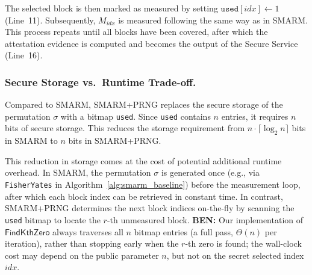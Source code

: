 \documentclass{ieeeaccess}
\DeclareRobustCommand{\ben}[1]{{\color{BENcolor}\textbf{BEN:} #1}}
\newcommand{\rtsmarmone}{SMARM+PRNG\xspace}
\begin{document}
The selected block is then marked as measured by setting $\texttt{used}[idx] \leftarrow 1$ (Line~11).
Subsequently, $M_{idx}$ is measured following the same way as in SMARM.
This process repeats until all blocks have been covered, after which the attestation evidence is computed and becomes the output of the Secure Service (Line~16).

\subsubsection{Secure Storage vs.\ Runtime Trade-off.}
Compared to SMARM, \rtsmarmone replaces the secure storage of the permutation $\sigma$ with a bitmap \texttt{used}.
Since \texttt{used} contains $n$ entries, it requires $n$ bits of secure storage.
This reduces the storage requirement from $n \cdot \lceil \log_2 n \rceil$ bits in SMARM to $n$ bits in \rtsmarmone.

This reduction in storage comes at the cost of potential additional runtime overhead.
In SMARM, the permutation $\sigma$ is generated once (e.g., via \texttt{FisherYates} in Algorithm~\ref{alg:smarm_baseline}) before the measurement loop, after which each block index can be retrieved in constant time.
In contrast, \rtsmarmone determines the next block indices on-the-fly by scanning the \texttt{used} bitmap to locate the $r$-th unmeasured block.
\ben{Our implementation of $\mathsf{FindKthZero}$ always traverses all $n$ bitmap entries (a full pass, $\Theta(n)$ per iteration), rather than stopping early when the $r$-th zero is found; the wall-clock cost may depend on the public parameter $n$, but not on the secret selected index $idx$.}
\end{document}
